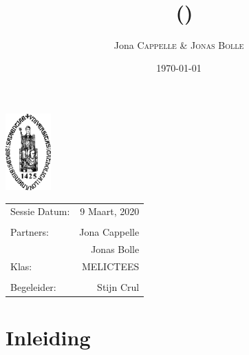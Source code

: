 \documentclass[11pt,twoside,a4paper]{article}
\title{\maintitle \\ \course \\{\small\ (\coursenumber)}} %
\author{Jona \textsc{Cappelle} \& \textsc{Jonas Bolle}} %
\date{\today} %
\newcommand{\class}{MELICTEES}
\begin{document}
\sloppy %
\begin{titlepage}
\maketitle %

\vfill
\begin{center}
\includegraphics[width=0.13\textwidth]{logo_kuleuven.png} %
\end{center}
\vfill
\vfill
\vfill

\begin{center}
\begin{tabular}{l r}
Sessie Datum: & 9 Maart, 2020 \\ %
\\
Partners: &  Jona Cappelle\\ %
&  Jonas Bolle\\
Klas: & \class \\
\\
Begeleider: &  Stijn Crul%
\end{tabular}
\end{center}
\vfill
\vfill
\end{titlepage}
\clearpage
\newpage\null\thispagestyle{empty}\newpage %



\restoregeometry%

\tableofcontents
\listoffigures
\listoftables
\listoflistings
\clearpage

\section{Inleiding}
\end{document}
